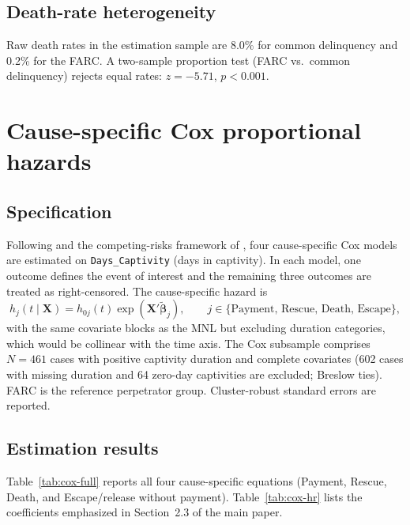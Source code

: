 \documentclass[ecta,nameyear,final,supplement]{econsocart}
\numberwithin{equation}{section}
\numberwithin{table}{section}
\begin{document}
\subsection{Death-rate heterogeneity}

Raw death rates in the estimation sample are 8.0\% for common delinquency
and 0.2\% for the FARC. A two-sample proportion test (FARC vs.\ common
delinquency) rejects equal rates: $z=-5.71$, $p<0.001$.

\section{Cause-specific Cox proportional hazards}
\label{sec:cox}

\subsection{Specification}

Following \citet{Cox1972} and the competing-risks framework of
\citet{Bradburn2003}, four cause-specific Cox models are estimated on
\texttt{Days\_Captivity} (days in captivity). In each model, one outcome
defines the event of interest and the remaining three outcomes are treated
as right-censored. The cause-specific hazard is
\begin{equation}
h_j(t \mid \mathbf{X}) = h_{0j}(t)\exp\!\left(\mathbf{X}'\tilde{\boldsymbol{\beta}}_j\right),
\qquad j\in\{\text{Payment, Rescue, Death, Escape}\},
\label{eq:cox-app}
\end{equation}
with the same covariate blocks as the MNL but excluding duration categories,
which would be collinear with the time axis. The Cox subsample comprises
$N=461$ cases with positive captivity duration and complete covariates (602
cases with missing duration and 64 zero-day captivities are excluded; Breslow
ties). FARC is the reference perpetrator group. Cluster-robust standard
errors are reported.

\subsection{Estimation results}

Table~\ref{tab:cox-full} reports all four cause-specific equations (Payment,
Rescue, Death, and Escape/release without payment). Table~\ref{tab:cox-hr}
lists the coefficients emphasized in Section~2.3 of the main paper.
\end{document}
